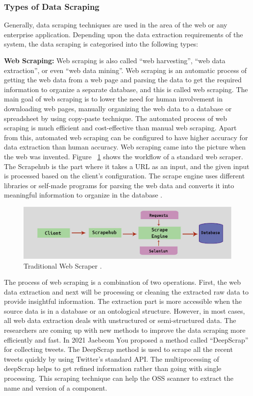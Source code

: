 \subsubsection{Types of Data Scraping}
Generally, data scraping techniques are used in the area of the web or any enterprise application. Depending upon the data extraction requirements of the system, the data scraping is categorised into the following types: 

{\bf Web Scraping:} Web scraping is also called “web harvesting”, “web data extraction”, or even “web data mining”. Web scraping is an automatic process of getting the web data from a web page and parsing the data to get the required information to organize a separate database, and this is called web scraping. The main goal of web scraping is to lower the need for human involvement in downloading web pages, manually organizing the web data to a database or spreadsheet by using copy-paste technique. The automated process of web scraping is much efficient and cost-effective than manual web scraping. Apart from this, automated web scraping can be configured to have higher accuracy for data extraction than human accuracy. Web scraping came into the picture when the web was invented. Figure  ~\ref{fig:webscraping} shows the workflow of a standard web scraper. The Scrapehub is the part where it takes a URL as an input, and the given input is processed based on the client’s configuration. The scrape engine uses different libraries or self-made programs for parsing the web data and converts it into meaningful information to organize in the database \cite{SaBa2016}.

\begin{figure}[H]
	\includegraphics[width=15cm]{includes/webscraping.png}
	\centering
	\caption{ Traditional Web Scraper \cite{SaBa2016}.}
	\label{fig:webscraping}
\end{figure}
The process of web scraping is a combination of two operations. First, the web data extraction and next will be processing or cleaning the extracted raw data to provide insightful information. The extraction part is more accessible when the source data is in a database or an ontological structure. However, in most cases, all web data extraction deals with unstructured or semi-structured data. The researchers are coming up with new methods to improve the data scraping more efficiently and fast. In 2021 Jaebeom You \cite{YoLeKw2021} proposed a method called “DeepScrap” for collecting tweets. The DeepScrap method is used to scrape all the recent tweets quickly by using Twitter’s standard API. The multiprocessing of deepScrap helps to get refined information rather than going with single processing. This scraping technique can help the OSS scanner to extract the name and version of a component.


